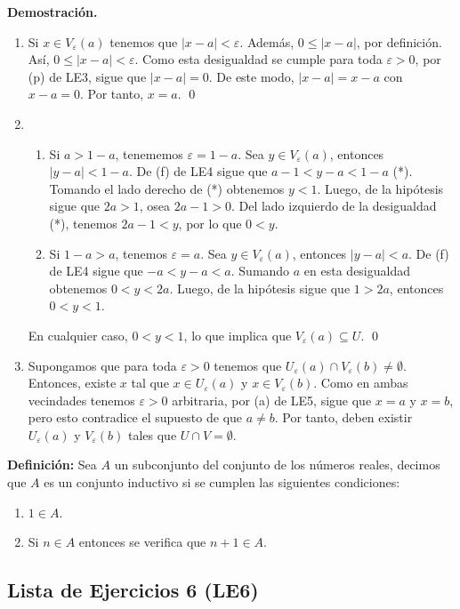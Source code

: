 \documentclass[11pt]{article}
\let\epsilon\varepsilon
\begin{document}
\textbf{Demostración.}

\begin{enumerate}[label=\alph*)]
    \item Si $x\in V_\varepsilon(a)$ tenemos que $|x-a|<\varepsilon$. Además, $0\leq |x-a|$, por definición. Así, $0\leq |x-a|<\varepsilon$. Como esta desigualdad se cumple para toda $\varepsilon>0$, por (p) de LE3, sigue que $|x-a|=0$. De este modo, $|x-a|=x-a$ con $x-a=0$. Por tanto, $x=a$. \qed
    
    \item \begin{enumerate}[label=\roman*)]
        \item Si $a>1-a$, tenememos $\varepsilon=1-a$. Sea $y\in V_\varepsilon(a)$, entonces $|y-a|<1-a$. De (f) de LE4 sigue que $a-1<y-a<1-a$ (*). Tomando el lado derecho de (*) obtenemos $y<1$. Luego, de la hipótesis sigue que $2a>1$, osea $2a-1>0$. Del lado izquierdo de la desigualdad (*), tenemos $2a-1<y$, por lo que $0<y$.
        \item Si $1-a>a$, tenemos $\varepsilon=a$. Sea $y\in V_\varepsilon(a)$, entonces $|y-a|<a$. De (f) de LE4 sigue que $-a<y-a<a$. Sumando $a$ en esta desigualdad obtenemos $0<y<2a$. Luego, de la hipótesis sigue que $1>2a$, entonces $0<y<1$.\end{enumerate}
        En cualquier caso, $0<y<1$, lo que implica que $V_\varepsilon(a) \subseteq U$. \qed

    \item Supongamos que para toda $\epsilon>0$ tenemos que $U_\varepsilon(a) \cap V_\varepsilon(b) \neq \emptyset$. Entonces, existe $x$ tal que $x\in U_\varepsilon(a)$ y $x\in V_\varepsilon(b)$. Como en ambas vecindades tenemos $\epsilon>0$ arbitraria, por (a) de LE5, sigue que $x=a$ y $x=b$, pero esto contradice el supuesto de que $a\neq b$. Por tanto, deben existir $U_\varepsilon(a)$ y $V_\varepsilon(b)$ tales que $U\cap V =\emptyset$.
    \end{enumerate}

\textbf{Definición:} Sea $A$ un subconjunto del conjunto de los números reales, decimos que $A$ es un conjunto inductivo si se cumplen las siguientes condiciones:
    \begin{enumerate}
        \item $1 \in A$.
        \item Si $n \in A$ entonces se verifica que $n+1 \in A$.
    \end{enumerate}

\subsection*{Lista de Ejercicios 6 (LE6)}
\end{document}
